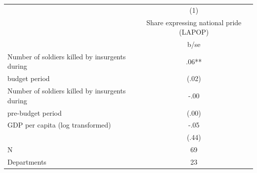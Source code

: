 {
\def\sym#1{\ifmmode^{#1}\else\(^{#1}\)\fi}
\begin{tabular}{l*{1}{c}}
\hline\hline
                                                  &\multicolumn{1}{c}{(1)}\\
                                                  &\multicolumn{1}{c}{Share expressing national pride (LAPOP)}\\
                                                  &        b/se   \\
\hline
Number of soldiers killed by insurgents during    &         .06** \\
budget period                                     &       (.02)   \\
Number of soldiers killed by insurgents during    &        -.00   \\
pre-budget period                                 &       (.00)   \\
GDP per capita (log transformed)                  &        -.05   \\
                                                  &       (.44)   \\
\hline
N                                                 &          69   \\
Departments                                       &          23   \\
\hline\hline
\end{tabular}
}
